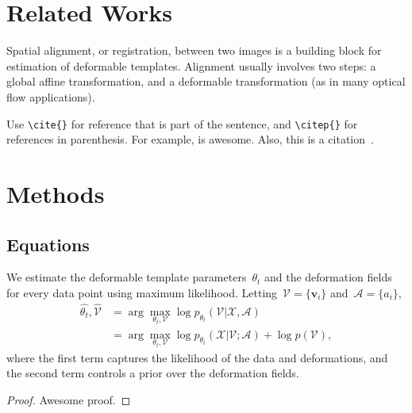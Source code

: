 \documentclass[twoside,11pt]{article}
\begin{document}
\section{Related Works}

Spatial alignment, or registration, between two images is a building block for estimation of deformable templates. Alignment usually involves two steps: a global affine transformation, and a deformable transformation (as in many optical flow applications).

Use \verb|\cite{}| for reference that is part of the sentence, and \verb|\citep{}| for references in parenthesis. For example, \cite{viola1997alignment} is awesome. Also, this is a citation~\citep{viola1997alignment}. 



\section{Methods}

\subsection{Equations}

We estimate the deformable template parameters~$\theta_t$ and the deformation fields for every data point using maximum likelihood. Letting~$\mathcal{V} = \{\boldsymbol{v}_i\}$ and~$\mathcal{A} = \{a_i\}$, 
%
\begin{align}
\hat{\theta_t}, \hat{\mathcal{V}} &= \arg \max_{\theta_t, \mathcal{V}} \log p_{\theta_t}(\mathcal{V} | \mathcal{X},  \mathcal{A}) \nonumber \\
&= \arg \max_{\theta_t, \mathcal{V}} \log p_{\theta_t}(\mathcal{X} | \mathcal{V}; \mathcal{A}) + \log p(\mathcal{V}),
\label{eq:logpost}
\end{align}
%
where the first term captures the likelihood of the data and deformations, and the second term controls a prior over the deformation fields.

\begin{proof}
    Awesome proof.
\end{proof}



\end{document}

